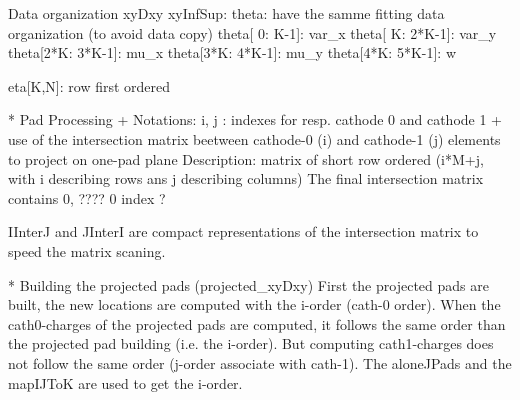 Data organization
 xyDxy
 xyInfSup:
 theta:
 have the samme fitting data organization (to avoid data copy)
theta[  0:   K-1]: var_x
theta[  K: 2*K-1]: var_y
theta[2*K: 3*K-1]: mu_x
theta[3*K: 4*K-1]: mu_y
theta[4*K: 5*K-1]: w


eta[K,N]: row first ordered


* Pad Processing
+ Notations:
  i, j : indexes for resp. cathode 0 and cathode 1
+ use of the intersection matrix beetween cathode-0 (i) and cathode-1 (j) 
elements to project on one-pad plane
Description: matrix of short row ordered (i*M+j, with i describing rows ans j describing columns)
The final intersection matrix contains 0, ???? 0 index ?

IInterJ and JInterI are compact representations of the intersection matrix to speed the matrix scaning.

* Building the projected pads (projected_xyDxy)
  First the projected pads are built, the new locations are computed with 
  the i-order (cath-0 order). When the cath0-charges of the projected pads
  are computed, it follows the same order than the projected pad 
  building (i.e. the i-order). But computing cath1-charges does not follow 
  the same order (j-order associate with cath-1). The aloneJPads and the mapIJToK 
  are used to get the i-order.
